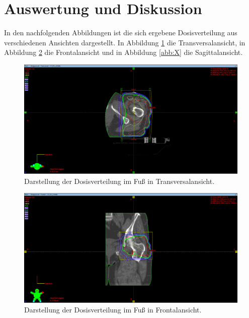 \section{Auswertung und Diskussion}
\label{sec:Auswertung}

In den nachfolgenden Abbildungen ist die sich ergebene Dosisverteilung aus verschiedenen
Ansichten dargestellt. In Abbildung \ref{abb:Z} die Transversalansicht, in Abbildung \ref{abb:Y} die
Frontalansicht und in Abbildung \ref{abb:X} die Sagittalansicht.


\begin{figure}[H]
  \centering
  \includegraphics[width=\textwidth]{Bilder/HüfteZ.png}
  \caption{Darstellung der Dosisverteilung im Fuß in Transversalansicht.}
  \label{abb:Z}
\end{figure}

\begin{figure}[H]
  \centering
  \includegraphics[width=\textwidth]{Bilder/HüfteY.png}
  \caption{Darstellung der Dosisverteilung im Fuß in Frontalansicht.}
  \label{abb:Y}
\end{figure}

